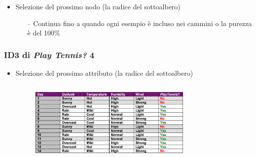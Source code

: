 \begin{frame}
\begin{itemize}
		
		\item Selezione del prossimo nodo (la radice del sottoalbero)
			\begin{itemize}
				\item[--] Continua fino a quando ogni esempio è incluso nei cammini o la purezza è del 100\%
			\end{itemize}
		
	\end{itemize}
	
\end{frame}


\begin{frame}
	
	\frametitle{ID3 di \textit{Play Tennis?} 4}

	\begin{itemize}
		\item Selezione del prossimo attributo (la radice del sottoalbero)
		
		\begin{columns}
	
			\begin{figure}[!htbp]
				\centering
				\includegraphics[width=1.00\linewidth]{images/supervised/decision_trees/example_play_tennis_sunny.png}
			\end{figure}
			
			
			
			\begin{figure}[!htbp]
				\centering
			\end{figure}
			

\end{columns}
\end{itemize}
\end{frame}
